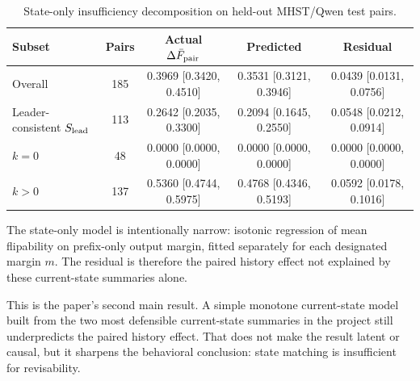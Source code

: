 \begin{table}[t]
    \centering
    \small
    \begin{threeparttable}
    \caption{State-only insufficiency decomposition on held-out MHST/Qwen test pairs.}
    \label{tab:state-only}
    \begin{tabularx}{\linewidth}{>{\raggedright\arraybackslash}X c c c c}
        \toprule
        Subset & Pairs & Actual $\Delta \bar{F}_{\mathrm{pair}}$ & Predicted & Residual \\
        \midrule
        Overall & 185 & 0.3969 [0.3420, 0.4510] & 0.3531 [0.3121, 0.3946] & 0.0439 [0.0131, 0.0756] \\
        Leader-consistent $S_{\mathrm{lead}}$ & 113 & 0.2642 [0.2035, 0.3300] & 0.2094 [0.1645, 0.2550] & 0.0548 [0.0212, 0.0914] \\
        $k{=}0$ & 48 & 0.0000 [0.0000, 0.0000] & 0.0000 [0.0000, 0.0000] & 0.0000 [0.0000, 0.0000] \\
        $k{>}0$ & 137 & 0.5360 [0.4744, 0.5975] & 0.4768 [0.4346, 0.5193] & 0.0592 [0.0178, 0.1016] \\
        \bottomrule
    \end{tabularx}
    \begin{tablenotes}[flushleft]
        \item The state-only model is intentionally narrow: isotonic regression of mean flipability on prefix-only output margin, fitted separately for each designated margin $m$. The residual is therefore the paired history effect not explained by these current-state summaries alone.
    \end{tablenotes}
    \end{threeparttable}
\end{table}

This is the paper's second main result. A simple monotone current-state model built from the two most defensible current-state summaries in the project still underpredicts the paired history effect. That does not make the result latent or causal, but it sharpens the behavioral conclusion: state matching is insufficient for revisability.
